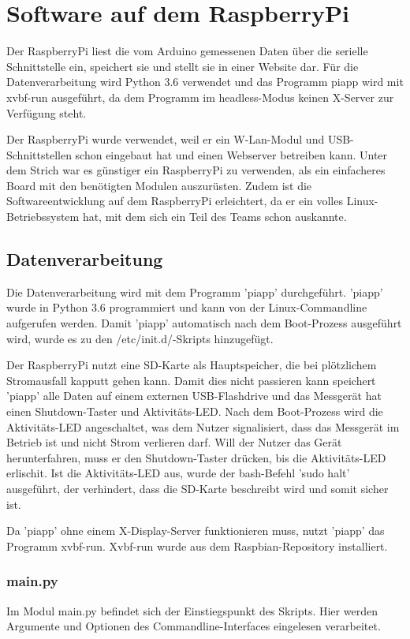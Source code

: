 \documentclass{article}
\begin{document}
\section{Software auf dem RaspberryPi}
Der RaspberryPi liest die vom Arduino gemessenen Daten über die serielle Schnittstelle ein, speichert sie und stellt sie in einer Website dar.
Für die Datenverarbeitung wird Python 3.6 verwendet und das Programm piapp wird mit xvbf-run ausgeführt, da dem Programm im headless-Modus keinen X-Server zur Verfügung steht.

Der RaspberryPi wurde verwendet, weil er ein W-Lan-Modul und USB-Schnittstellen schon eingebaut hat und einen Webserver betreiben kann.
Unter dem Strich war es günstiger ein RaspberryPi zu verwenden, als ein einfacheres Board mit den benötigten Modulen auszurüsten.
Zudem ist die Softwareentwicklung auf dem RaspberryPi erleichtert, da er ein volles Linux-Betriebssystem hat, mit dem sich ein Teil des Teams schon auskannte.

\subsection{Datenverarbeitung}
Die Datenverarbeitung wird mit dem Programm 'piapp' durchgeführt.
'piapp' wurde in Python 3.6 programmiert und kann von der Linux-Commandline aufgerufen werden.
Damit 'piapp' automatisch nach dem Boot-Prozess ausgeführt wird, wurde es zu den /etc/init.d/-Skripts hinzugefügt.

Der RaspberryPi nutzt eine SD-Karte als Hauptspeicher, die bei plötzlichem Stromausfall kapputt gehen kann.
Damit dies nicht passieren kann speichert 'piapp' alle Daten auf einem externen USB-Flashdrive und das Messgerät hat einen Shutdown-Taster und Aktivitäts-LED.
Nach dem Boot-Prozess wird die Aktivitäts-LED angeschaltet, was dem Nutzer signalisiert, dass das Messgerät im Betrieb ist und nicht Strom verlieren darf.
Will der Nutzer das Gerät herunterfahren, muss er den Shutdown-Taster drücken, bis die Aktivitäts-LED erlischit.
Ist die Aktivitäts-LED aus, wurde der bash-Befehl 'sudo halt' ausgeführt, der verhindert, dass die SD-Karte beschreibt wird und somit sicher ist.

Da 'piapp' ohne einem X-Display-Server funktionieren muss, nutzt 'piapp' das Programm xvbf-run.
Xvbf-run wurde aus dem Raspbian-Repository installiert.

\subsubsection{main.py}
Im Modul main.py befindet sich der Einstiegspunkt des Skripts.
Hier werden Argumente und Optionen des Commandline-Interfaces eingelesen verarbeitet.
\end{document}
